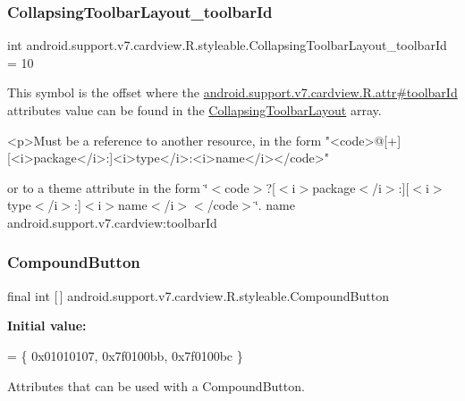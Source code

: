\subsubsection{\texorpdfstring{Collapsing\+Toolbar\+Layout\+\_\+toolbar\+Id}{CollapsingToolbarLayout\_toolbarId}}
{\footnotesize\ttfamily int android.\+support.\+v7.\+cardview.\+R.\+styleable.\+Collapsing\+Toolbar\+Layout\+\_\+toolbar\+Id = 10\hspace{0.3cm}{\ttfamily [static]}}

This symbol is the offset where the \hyperlink{classandroid_1_1support_1_1v7_1_1cardview_1_1R_1_1attr_a602ae2bf742a9f0969aa808023ae9582}{android.\+support.\+v7.\+cardview.\+R.\+attr\#toolbar\+Id} attribute\textquotesingle{}s value can be found in the \hyperlink{classandroid_1_1support_1_1v7_1_1cardview_1_1R_1_1styleable_a3b4c5393d0c99cb4e5a7a3911fc606b4}{Collapsing\+Toolbar\+Layout} array.

\begin{DoxyVerb}      <p>Must be a reference to another resource, in the form "<code>@[+][<i>package</i>:]<i>type</i>:<i>name</i></code>"
\end{DoxyVerb}
 or to a theme attribute in the form \char`\"{}$<$code$>$?\mbox{[}$<$i$>$package$<$/i$>$\+:\mbox{]}\mbox{[}$<$i$>$type$<$/i$>$\+:\mbox{]}$<$i$>$name$<$/i$>$$<$/code$>$\char`\"{}.  name android.\+support.\+v7.\+cardview\+:toolbar\+Id \mbox{\label{classandroid_1_1support_1_1v7_1_1cardview_1_1R_1_1styleable_a4e5dd24a739b20fb1bfbda95e04d1d75}} 
\subsubsection{\texorpdfstring{Compound\+Button}{CompoundButton}}
{\footnotesize\ttfamily final int \mbox{[}$\,$\mbox{]} android.\+support.\+v7.\+cardview.\+R.\+styleable.\+Compound\+Button\hspace{0.3cm}{\ttfamily [static]}}

{\bfseries Initial value\+:}
\begin{DoxyCode}
= \{
            0x01010107, 0x7f0100bb, 0x7f0100bc
        \}
\end{DoxyCode}
Attributes that can be used with a Compound\+Button. 

